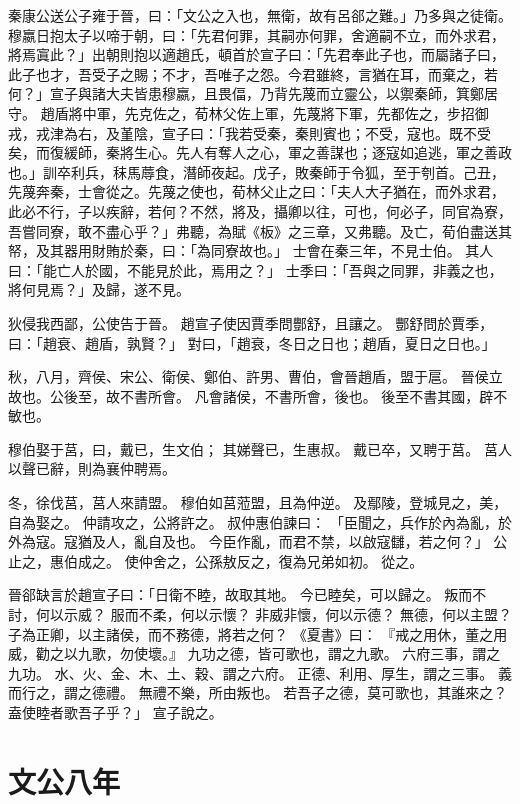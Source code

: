 \documentclass{ctexart}
\begin{document}
秦康公送公子雍于晉，曰：「文公之入也，無衛，故有呂郤之難。」乃多與之徒衛。穆嬴日抱太子以啼于朝，曰：「先君何罪，其嗣亦何罪，舍適嗣不立，而外求君，將焉寘此？」出朝則抱以適趙氏，頓首於宣子曰：「先君奉此子也，而屬諸子曰，此子也才，吾受子之賜；不才，吾唯子之怨。今君雖終，言猶在耳，而棄之，若何？」宣子與諸大夫皆患穆嬴，且畏偪，乃背先蔑而立靈公，以禦秦師，箕鄭居守。
趙盾將中軍，先克佐之，荀林父佐上軍，先蔑將下軍，先都佐之，步招御戎，戎津為右，及堇陰，宣子曰：「我若受秦，秦則賓也；不受，寇也。既不受矣，而復緩師，秦將生心。先人有奪人之心，軍之善謀也；逐寇如追逃，軍之善政也。」訓卒利兵，秣馬蓐食，潛師夜起。戊子，敗秦師于令狐，至于刳首。己丑，先蔑奔秦，士會從之。先蔑之使也，荀林父止之曰：「夫人大子猶在，而外求君，此必不行，子以疾辭，若何？不然，將及，攝卿以往，可也，何必子，同官為寮，吾嘗同寮，敢不盡心乎？」弗聽，為賦《板》之三章，又弗聽。及亡，荀伯盡送其帑，及其器用財賄於秦，曰：「為同寮故也。」
士會在秦三年，不見士伯。
其人曰：「能亡人於國，不能見於此，焉用之？」
士季曰：「吾與之同罪，非義之也，將何見焉？」及歸，遂不見。

狄侵我西鄙，公使告于晉。
趙宣子使因賈季問酆舒，且讓之。
酆舒問於賈季，曰：「趙衰、趙盾，孰賢？」
對曰，「趙衰，冬日之日也；趙盾，夏日之日也。」 

秋，八月，齊侯、宋公、衛侯、鄭伯、許男、曹伯，會晉趙盾，盟于扈。
晉侯立故也。公後至，故不書所會。
凡會諸侯，不書所會，後也。
後至不書其國，辟不敏也。

穆伯娶于莒，曰，戴已，生文伯；
其娣聲已，生惠叔。
戴已卒，又聘于莒。
莒人以聲已辭，則為襄仲聘焉。

冬，徐伐莒，莒人來請盟。
穆伯如莒蒞盟，且為仲逆。
及鄢陵，登城見之，美，自為娶之。
仲請攻之，公將許之。
叔仲惠伯諫曰：
「臣聞之，兵作於內為亂，於外為寇。寇猶及人，亂自及也。
今臣作亂，而君不禁，以啟寇讎，若之何？」
公止之，惠伯成之。
使仲舍之，公孫敖反之，復為兄弟如初。
從之。

晉郤缺言於趙宣子曰：「日衛不睦，故取其地。
今已睦矣，可以歸之。
叛而不討，何以示威？
服而不柔，何以示懷？
非威非懷，何以示德？
無德，何以主盟？
子為正卿，以主諸侯，而不務德，將若之何？
《夏書》曰：
『戒之用休，董之用威，勸之以九歌，勿使壞。』
九功之德，皆可歌也，謂之九歌。
六府三事，謂之九功。
水、火、金、木、土、穀、謂之六府。
正德、利用、厚生，謂之三事。
義而行之，謂之德禮。
無禮不樂，所由叛也。
若吾子之德，莫可歌也，其誰來之？
盍使睦者歌吾子乎？」
宣子說之。 




\section{文公八年}
\end{document}
